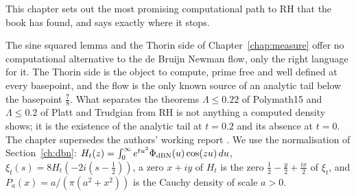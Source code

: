 \label{chap:phase}

This chapter sets out the most promising computational path to RH that the book has found, and says exactly where it stops.

The sine squared lemma and the Thorin side of Chapter~\ref{chap:measure} offer no computational alternative to the de Bruijn Newman flow, only the right language for it. The Thorin side is the object to compute, prime free and well defined at every basepoint, and the flow is the only known source of an analytic tail below the basepoint $\frac78$. What separates the theorems $\Lambda\le0.22$ of Polymath15 \cite{Polymath} and $\Lambda\le0.2$ of Platt and Trudgian \cite{PT21} from RH is not anything a computed density shows; it is the existence of the analytic tail at $t=0.2$ and its absence at $t=0$. The chapter supersedes the authors' working report \cite{FA26}. We use the normalisation of Section~\ref{ch:dbn}: $H_t(z)=\int_0^\infty e^{tu^2}\Phi_{\rm dBN}(u)\cos(zu)\,du$, $\xi_t(s)=8H_t(-2i(s-\frac12))$, a zero $x+iy$ of $H_t$ is the zero $\frac12-\frac y2+\frac{ix}2$ of $\xi_t$, and $P_a(x)=a/(\pi(a^2+x^2))$ is the Cauchy density of scale $a>0$.
